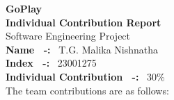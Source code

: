 \documentclass[12pt,a4paper]{article}
\begin{document}
\begin{center}
\vspace*{1.2cm}
{\Huge\bfseries GoPlay}\\[0.5cm]
{\LARGE\bfseries Individual Contribution Report}\\[0.4cm]
{\large Software Engineering Project}\\[1.8cm]

{\large \textbf{Name ~-:}~ T.G. Malika Nishnatha}\\[0.3cm]
{\large \textbf{Index ~-:}~ 23001275}\\[0.3cm]
{\large \textbf{Individual Contribution ~-:}~ 30\%}\\[1.8cm]

{\normalsize The team contributions are as follows:}
\end{center}

\vspace{0.4cm}
\end{document}
